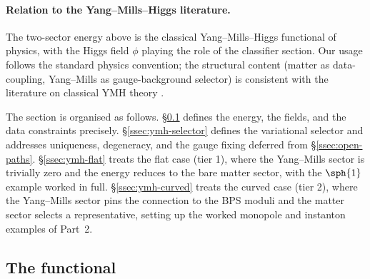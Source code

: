 \paragraph{Relation to the Yang--Mills--Higgs literature.} The
two-sector energy above is the classical Yang--Mills--Higgs
functional of physics, with the Higgs field $\phi$ playing the role
of the classifier section. Our usage follows the standard physics
convention; the structural content (matter as data-coupling,
Yang--Mills as gauge-background selector) is consistent with the
literature on classical YMH theory \cite{JaffeTaubes}.

The section is organised as follows. \S\ref{ssec:ymh-functional}
defines the energy, the fields, and the data constraints precisely.
\S\ref{ssec:ymh-selector} defines the variational selector and
addresses uniqueness, degeneracy, and the gauge fixing deferred from
\S\ref{ssec:open-paths}. \S\ref{ssec:ymh-flat} treats the flat case
(tier 1), where the Yang--Mills sector is trivially zero and the
energy reduces to the bare matter sector, with the $\sph{1}$ example
worked in full. \S\ref{ssec:ymh-curved} treats the curved case
(tier 2), where the Yang--Mills sector pins the connection to the
BPS moduli and the matter sector selects a representative, setting
up the worked monopole and instanton examples of Part~2.

\subsection{The functional}\label{ssec:ymh-functional}

